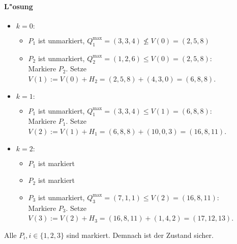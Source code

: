 \paragraph{L"osung}

\begin{itemize}
\item $k = 0:$
  \begin{itemize}
  \item $P_1$ ist unmarkiert,
    $Q_1^\text{max} = (3, 3, 4) \not \le V(0) = (2, 5, 8)$
  \item $P_2$ ist unmarkiert,
    $Q_2^\text{max} = (1, 2, 6) \le V(0) = (2, 5, 8)$: \\
    Markiere $P_2$.
    Setze $V(1) := V(0) + H_2 = (2, 5, 8) + (4, 3, 0) = (6, 8, 8)$.
  \end{itemize}

\item $k = 1:$
  \begin{itemize}
  \item $P_1$ ist unmarkiert,
    $Q_1^\text{max} = (3, 3, 4) \le V(1) = (6, 8, 8)$: \\
    Markiere $P_1$.
    Setze $V(2) := V(1) + H_1 = (6, 8, 8) + (10, 0, 3) = (16, 8, 11)$.
  \end{itemize}

\item $k = 2:$
  \begin{itemize}
  \item $P_1$ ist markiert
  \item $P_2$ ist markiert
  \item $P_3$ ist unmarkiert,
    $Q_3^\text{max} = (7, 1, 1) \le V(2) = (16, 8, 11)$: \\
    Markiere $P_3$.
    Setze $V(3) := V(2) + H_3 = (16, 8, 11) + (1, 4, 2) = (17, 12, 13)$.
  \end{itemize}
\end{itemize}

Alle $P_i, i \in \{1, 2, 3\}$ sind markiert.  Demnach ist der Zustand
sicher.

